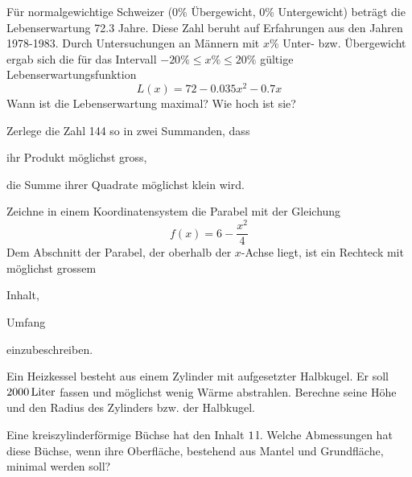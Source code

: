 \documentclass[%
11pt,%
twoside,%
titlepage,%
german,%
headsepline%
]{scrartcl}
\begin{document}
\begin{ueb}[Normgewicht]
F\"ur normalgewichtige Schweizer (0\% \"Ubergewicht, 0\% Untergewicht) betr\"agt die Lebenserwartung 72.3 Jahre. Diese Zahl beruht auf Erfahrungen aus den Jahren 1978-1983. Durch Untersuchungen an M\"annern mit $x\%$ Unter- bzw. \"Ubergewicht ergab sich die f\"ur das Intervall $-20\%\leq x\% \leq 20\%$ g\"ultige Lebenserwartungsfunktion
$$L(x)=72-0.035x^2-0.7x$$
Wann ist die Lebenserwartung maximal? Wie hoch ist sie?
\end{ueb}

\begin{ueb}[zerlegen]
Zerlege die Zahl 144 so in zwei Summanden, dass
\begin{enumeratea}
\item ihr Produkt m\"oglichst gross,
\item die Summe ihrer Quadrate m\"oglichst klein wird.
\end{enumeratea}
\end{ueb}

\begin{ueb}[Parabel]
Zeichne in einem Koordinatensystem die Parabel mit der Gleichung
$$f(x) = 6 - \frac{x^2}{4}$$
Dem Abschnitt der Parabel, der oberhalb der $x$-Achse liegt, ist ein Rechteck mit m\"oglichst grossem
\begin{enumeratea}
\item Inhalt,
\item Umfang
\end{enumeratea}
einzubeschreiben.
\end{ueb}

\begin{ueb}[Heizkessel]
 Ein Heizkessel besteht aus einem Zylinder mit aufgesetzter Halbkugel. Er soll $\unit[2000]{Liter}$ fassen und m\"oglichst wenig W\"arme abstrahlen. Berechne seine Höhe und den Radius des Zylinders bzw. der Halbkugel.
 \end{ueb}

\begin{ueb}[Büchse]
Eine
kreiszylinderf\"ormige B\"uchse hat den Inhalt $\unit[1]{l}$. Welche Abmessungen hat diese B\"uchse, wenn ihre Oberfl\"ache, bestehend aus Mantel und Grundfl\"ache, minimal werden soll?
\end{ueb}
\end{document}
